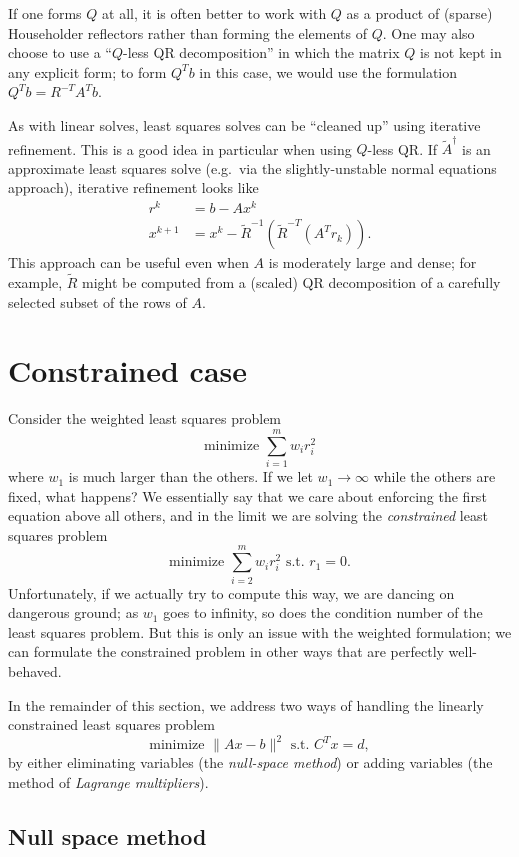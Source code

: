 \documentclass[12pt, leqno]{article} %
\begin{document}
If one forms $Q$ at all, it is often better to work with $Q$ as a
product of (sparse) Householder reflectors rather than forming the
elements of $Q$.  One may also choose to use a ``$Q$-less QR decomposition''
in which the matrix $Q$ is not kept in any explicit form; to form $Q^T b$
in this case, we would use the formulation $Q^T b = R^{-T} A^T b$.

As with linear solves, least squares solves can be ``cleaned up''
using iterative refinement.  This is a good idea in particular when
using $Q$-less QR.  If $\tilde{A}^\dagger$ is an approximate least
squares solve (e.g.~via the slightly-unstable normal equations approach),
iterative refinement looks like
\begin{align*}
  r^{k} &= b-Ax^{k} \\
  x^{k+1} &= x^k - \tilde{R}^{-1} (\tilde{R}^{-T} (A^T r_k)).
\end{align*}
This approach can be useful even when $A$ is moderately large and dense;
for example, $\tilde{R}$ might be computed from a (scaled) QR
decomposition of a carefully selected subset of the rows of $A$.

\section{Constrained case}

Consider the weighted least squares problem
\[
  \mbox{minimize } \sum_{i=1}^m w_i r_i^2
\]
where $w_1$ is much larger than the others.  If we
let $w_1 \rightarrow \infty$ while the others are fixed, what happens?
We essentially say that we care about enforcing the first equation
above all others, and in the limit we are solving the {\em constrained}
least squares problem
\[
  \mbox{minimize } \sum_{i=2}^m w_i r_i^2 \mbox{ s.t. } r_1 = 0.
\]
Unfortunately, if we actually try to compute this way, we are dancing on
dangerous ground; as $w_1$ goes to infinity, so does the condition
number of the least squares problem.  But this is only an issue with the
weighted formulation; we can formulate the constrained problem in other
ways that are perfectly well-behaved.

In the remainder of this section, we address two ways of handling
the linearly constrained least squares problem
\[
  \mbox{minimize } \|Ax-b\|^2 \mbox{ s.t. } C^T x = d,
\]
by either eliminating variables (the {\em null-space method}) or adding
variables (the method of {\em Lagrange multipliers}).

\subsection{Null space method}
\end{document}
